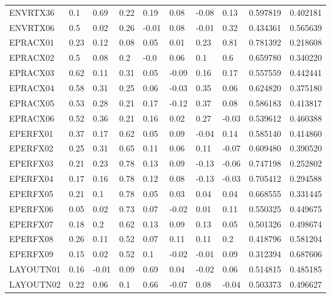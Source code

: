 \begin{landscape}
\begin{longtable}{llllllllll}
ENVRTX36 & 0.1 & \cellcolor{yellow}0.69 & 0.22 & 0.19 & 0.08 & -0.08 & 0.13 & 0.597819 & 0.402181 \\
ENVRTX06 & 0.5 & 0.02 & 0.26 & -0.01 & 0.08 & -0.01 & 0.32 & 0.434361 & 0.565639 \\
EPRACX01 & 0.23 & 0.12 & 0.08 & 0.05 & 0.01 & 0.23 & \cellcolor{yellow}0.81 & 0.781392 & 0.218608 \\
EPRACX02 & 0.5 & 0.08 & 0.2 & -0.0 & 0.06 & 0.1 & \cellcolor{yellow}0.6 & 0.659780 & 0.340220 \\
EPRACX03 & \cellcolor{yellow}0.62 & 0.11 & 0.31 & 0.05 & -0.09 & 0.16 & 0.17 & 0.557559 & 0.442441 \\
EPRACX04 & \cellcolor{yellow}0.58 & 0.31 & 0.25 & 0.06 & -0.03 & 0.35 & 0.06 & 0.624820 & 0.375180 \\
EPRACX05 & \cellcolor{yellow}0.53 & 0.28 & 0.21 & 0.17 & -0.12 & 0.37 & 0.08 & 0.586183 & 0.413817 \\
EPRACX06 & \cellcolor{yellow}0.52 & 0.36 & 0.21 & 0.16 & 0.02 & 0.27 & -0.03 & 0.539612 & 0.460388 \\
EPERFX01 & 0.37 & 0.17 & \cellcolor{yellow}0.62 & 0.05 & 0.09 & -0.04 & 0.14 & 0.585140 & 0.414860 \\
EPERFX02 & 0.25 & 0.31 & \cellcolor{yellow}0.65 & 0.11 & 0.06 & 0.11 & -0.07 & 0.609480 & 0.390520 \\
EPERFX03 & 0.21 & 0.23 & \cellcolor{yellow}0.78 & 0.13 & 0.09 & -0.13 & -0.06 & 0.747198 & 0.252802 \\
EPERFX04 & 0.17 & 0.16 & \cellcolor{yellow}0.78 & 0.12 & 0.08 & -0.13 & -0.03 & 0.705412 & 0.294588 \\
EPERFX05 & 0.21 & 0.1 & \cellcolor{yellow}0.78 & 0.05 & 0.03 & 0.04 & 0.04 & 0.668555 & 0.331445 \\
EPERFX06 & 0.05 & 0.02 & \cellcolor{yellow}0.73 & 0.07 & -0.02 & 0.01 & 0.11 & 0.550325 & 0.449675 \\
EPERFX07 & 0.18 & 0.2 & \cellcolor{yellow}0.62 & 0.13 & 0.09 & 0.13 & 0.05 & 0.501326 & 0.498674 \\
EPERFX08 & 0.26 & 0.11 & \cellcolor{yellow}0.52 & 0.07 & 0.11 & 0.11 & 0.2 & 0.418796 & 0.581204 \\
EPERFX09 & 0.15 & 0.02 & \cellcolor{yellow}0.52 & 0.1 & -0.02 & -0.01 & 0.09 & 0.312394 & 0.687606 \\
LAYOUTN01 & 0.16 & -0.01 & 0.09 & \cellcolor{yellow}0.69 & 0.04 & -0.02 & 0.06 & 0.514815 & 0.485185 \\
LAYOUTN02 & 0.22 & 0.06 & 0.1 & \cellcolor{yellow}0.66 & -0.07 & 0.08 & -0.04 & 0.503373 & 0.496627 \\

\end{longtable}
\end{landscape}
